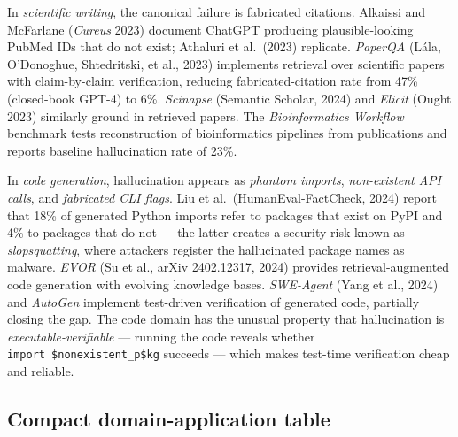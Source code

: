 \documentclass{article}
\begin{document}
In \emph{scientific writing}, the canonical failure is fabricated citations. Alkaissi and McFarlane (\emph{Cureus} 2023) document ChatGPT producing plausible-looking PubMed IDs that do not exist; Athaluri et al.~(2023) replicate. \emph{PaperQA} (Lála, O'Donoghue, Shtedritski, et al., 2023) implements retrieval over scientific papers with claim-by-claim verification, reducing fabricated-citation rate from 47\% (closed-book GPT-4) to 6\%. \emph{Scinapse} (Semantic Scholar, 2024) and \emph{Elicit} (Ought 2023) similarly ground in retrieved papers. The \emph{Bioinformatics Workflow} benchmark \citep{wang2024factualityoflargel} tests reconstruction of bioinformatics pipelines from publications and reports baseline hallucination rate of 23\%.

In \emph{code generation}, hallucination appears as \emph{phantom imports}, \emph{non-existent API calls}, and \emph{fabricated CLI flags}. Liu et al.~(HumanEval-FactCheck, 2024) report that 18\% of generated Python imports refer to packages that exist on PyPI and 4\% to packages that do not --- the latter creates a security risk known as \emph{slopsquatting}, where attackers register the hallucinated package names as malware. \emph{EVOR} (Su et al., arXiv 2402.12317, 2024) provides retrieval-augmented code generation with evolving knowledge bases. \emph{SWE-Agent} (Yang et al., 2024) and \emph{AutoGen} implement test-driven verification of generated code, partially closing the gap. The code domain has the unusual property that hallucination is \emph{executable-verifiable} --- running the code reveals whether \texttt{import\ \$nonexistent\_p\$kg} succeeds --- which makes test-time verification cheap and reliable.

\subsection{Compact domain-application table}\label{compact-domain-application-table}
\end{document}

